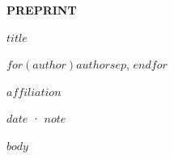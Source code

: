 \documentclass[10pt]{article}
\begin{document}
\thispagestyle{plain}
\begin{flushleft}
{\sffamily\footnotesize\color{accent}\textbf{PREPRINT}}\par\vspace{4pt}
{\sffamily\bfseries\LARGE\color{ink}$title$\par}
\vspace{8pt}
{\sffamily\normalsize $for(author)$$author$$sep$, $endfor$\par}
\vspace{2pt}
{\sffamily\footnotesize\color{ink2}$affiliation$\par}
\vspace{2pt}
{\sffamily\footnotesize\color{ink2}$date$ · $note$\par}
\end{flushleft}
\vspace{6pt}
$body$
\end{document}

